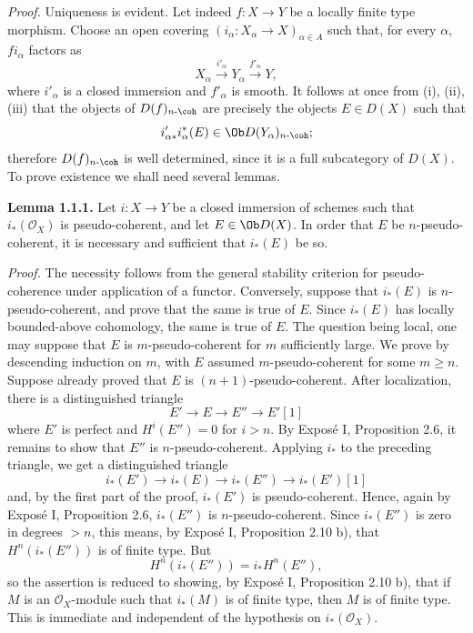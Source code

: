 \emph{Proof.} Uniqueness is evident. Let indeed \(f:X\to Y\) be a locally finite type morphism. Choose an open covering \((i_\alpha:X_\alpha\to X)_{\alpha\in A}\) such that, for every \(\alpha\), \(fi_\alpha\) factors as
\[
  X_\alpha \xrightarrow{i'_\alpha} Y_\alpha \xrightarrow{f'_\alpha} Y,
\]
where \(i'_\alpha\) is a closed immersion and \(f'_\alpha\) is smooth. It follows at once from (i), (ii), (iii) that the objects of \(D(f)_{n\text{-}\coh}\) are precisely the objects \(E\in D(X)\) such that
\[
  i'_{\alpha *}i_\alpha^*(E)\in \Ob D(Y_\alpha)_{n\text{-}\coh};
\]
therefore \(D(f)_{n\text{-}\coh}\) is well determined, since it is a full subcategory of \(D(X)\). To prove existence we shall need several lemmas.

\textbf{Lemma 1.1.1.} Let \(i:X\to Y\) be a closed immersion of schemes such that \(i_*(\mathcal O_X)\) is pseudo-coherent, and let \(E\in \Ob D(X)\). In order that \(E\) be \(n\)-pseudo-coherent, it is necessary and sufficient that \(i_*(E)\) be so.

\emph{Proof.} The necessity follows from the general stability criterion for pseudo-coherence under application of a functor. Conversely, suppose that \(i_*(E)\) is \(n\)-pseudo-coherent, and prove that the same is true of \(E\). Since \(i_*(E)\) has locally bounded-above cohomology, the same is true of \(E\). The question being local, one may suppose that \(E\) is \(m\)-pseudo-coherent for \(m\) sufficiently large. We prove by descending induction on \(m\), with \(E\) assumed \(m\)-pseudo-coherent for some \(m\geq n\). Suppose already proved that \(E\) is \((n+1)\)-pseudo-coherent. After localization, there is a distinguished triangle
\[
E'\longrightarrow E\longrightarrow E''\longrightarrow E'[1]
\]
where \(E'\) is perfect and \(H^i(E'')=0\) for \(i>n\). By Exposé I, Proposition 2.6, it remains to show that \(E''\) is \(n\)-pseudo-coherent. Applying \(i_*\) to the preceding triangle, we get a distinguished triangle
\[
i_*(E')\longrightarrow i_*(E)\longrightarrow i_*(E'')\longrightarrow i_*(E')[1]
\]
and, by the first part of the proof, \(i_*(E')\) is pseudo-coherent. Hence, again by Exposé I, Proposition 2.6, \(i_*(E'')\) is \(n\)-pseudo-coherent. Since \(i_*(E'')\) is zero in degrees \(>n\), this means, by Exposé I, Proposition 2.10 b), that \(H^n(i_*(E''))\) is of finite type. But
\[
  H^n(i_*(E''))=i_*H^n(E''),
\]
so the assertion is reduced to showing, by Exposé I, Proposition 2.10 b), that if \(M\) is an \(\mathcal O_X\)-module such that \(i_*(M)\) is of finite type, then \(M\) is of finite type. This is immediate and independent of the hypothesis on \(i_*(\mathcal O_X)\).

